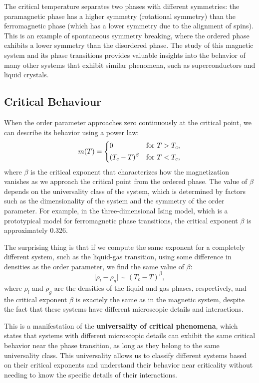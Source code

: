 The critical temperature separates two phases with different symmetries: the paramagnetic phase has a higher symmetry (rotational symmetry) than the ferromagnetic phase (which has a lower symmetry due to the alignment of spins). This is an example of spontaneous symmetry breaking, where the ordered phase exhibits a lower symmetry than the disordered phase. The study of this magnetic system and its phase transitions provides valuable insights into the behavior of many other systems that exhibit similar phenomena, such as superconductors and liquid crystals.

\subsection{Critical Behaviour}

When the order parameter approaches zero continuously at the critical point, we can describe its behavior using a power law:
\[
    m(T) = \begin{dcases}
        0               & \text{for } T > T_c, \\
        (T_c - T)^\beta & \text{for } T < T_c,
    \end{dcases}
\]
where $\beta$ is the critical exponent that characterizes how the magnetization vanishes as we approach the critical point from the ordered phase. The value of $\beta$ depends on the universality class of the system, which is determined by factors such as the dimensionality of the system and the symmetry of the order parameter. For example, in the three-dimensional Ising model, which is a prototypical model for ferromagnetic phase transitions, the critical exponent $\beta$ is approximately 0.326.

The surprising thing is that if we compute the same exponent for a completely different system, such as the liquid-gas transition, using some difference in densities as the order parameter, we find the same value of $\beta$:
\[
    \vert \rho_l - \rho_g \vert \sim (T_c - T)^\beta,
\]
where $\rho_l$ and $\rho_g$ are the densities of the liquid and gas phases, respectively, and the critical exponent $\beta$ is exactely the same as in the magnetic system, despite the fact that these systems have different microscopic details and interactions.

This is a manifestation of the \textbf{universality of critical phenomena}, which states that systems with different microscopic details can exhibit the same critical behavior near the phase transition, as long as they belong to the same universality class. This universality allows us to classify different systems based on their critical exponents and understand their behavior near criticality without needing to know the specific details of their interactions.

